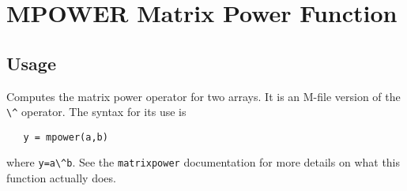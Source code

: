 \section{MPOWER Matrix Power Function}

\subsection{Usage}

Computes the matrix power operator for two arrays.  It is an
M-file version of the \verb|\^| operator.  The syntax for its use is
\begin{verbatim}
   y = mpower(a,b)
\end{verbatim}
where \verb|y=a\^b|.  See the \verb|matrixpower| documentation for more
details on what this function actually does.
